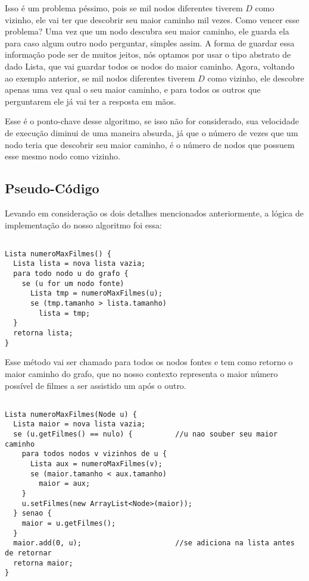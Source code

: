 \documentclass[12pt]{article}
\begin{document}
Isso é um problema péssimo, pois se mil nodos diferentes tiverem $D$ como vizinho, ele vai ter que descobrir seu maior caminho mil vezes. Como vencer esse problema? Uma vez que um nodo descubra seu maior caminho, ele guarda ela para caso algum outro nodo perguntar, simples assim. A forma de guardar essa informação pode ser de muitos jeitos, nós optamos por usar o tipo abstrato de dado Lista, que vai guardar todos os nodos do maior caminho. Agora, voltando ao exemplo anterior, se mil nodos diferentes tiverem $D$ como vizinho, ele descobre apenas uma vez qual o seu maior caminho, e para todos os outros que perguntarem ele já vai ter a resposta em mãos.

Esse é o ponto-chave desse algoritmo, se isso não for considerado, sua velocidade de execução diminui de uma maneira absurda, já que o número de vezes que um nodo teria que descobrir seu maior caminho, é o número de nodos que possuem esse mesmo nodo como vizinho.

\subsection{Pseudo-Código}

Levando em consideração os dois detalhes mencionados anteriormente, a lógica de implementação do nosso algoritmo foi essa:

\begin{lstlisting}

Lista numeroMaxFilmes() {
  Lista lista = nova lista vazia;
  para todo nodo u do grafo {
    se (u for um nodo fonte)
      Lista tmp = numeroMaxFilmes(u);
      se (tmp.tamanho > lista.tamanho)
        lista = tmp;
  }
  retorna lista;
}

\end{lstlisting}

Esse método vai ser chamado para todos os nodos fontes e tem como retorno o maior caminho do grafo, que no nosso contexto representa o maior número possível de filmes a ser assistido um após o outro.

\vspace{5.0cm}

\begin{lstlisting}

Lista numeroMaxFilmes(Node u) {
  Lista maior = nova lista vazia;
  se (u.getFilmes() == nulo) {          //u nao souber seu maior caminho
    para todos nodos v vizinhos de u {
      Lista aux = numeroMaxFilmes(v);
      se (maior.tamanho < aux.tamanho)
        maior = aux;
    }
    u.setFilmes(new ArrayList<Node>(maior));
  } senao {
    maior = u.getFilmes();
  }
  maior.add(0, u);                      //se adiciona na lista antes de retornar
  retorna maior;
}  

\end{lstlisting}
\end{document}
